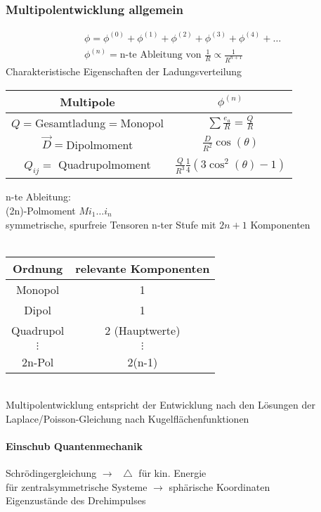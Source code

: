 \documentclass[a4paper]{article}
\newcommand*\laplace{\mathop{}\!\mathbin\bigtriangleup}
\begin{document}
\subsubsection{Multipolentwicklung allgemein}
\begin{align}
\phi=\phi^{(0)}+\phi^{(1)}+\phi^{(2)}+\phi^{(3)}+\phi^{(4)}+\ldots\\
\phi^{(n)}=\text{n-te Ableitung von }\frac{1}{R}\propto \frac{1}{R^{n+1}}
\end{align}
Charakteristische Eigenschaften der Ladungsverteilung\\
\begin{tabular}{c|c}
Multipole & $\phi^{(n)}$\\
\hline
$Q=$Gesamtladung$=$Monopol & $\sum \frac{e_a}{R}=\frac{Q}{R}$\\
$\vec{D}=$Dipolmoment &$\frac{D}{R^2}\cos(\theta)$\\
$Q_{ij}=$ Quadrupolmoment & $\frac{Q}{R^3}\frac{1}{4}\left(3
\cos^2(\theta)-1\right)$\\
\end{tabular}
n-te Ableitung:\\ 
(2n)-Polmoment $M{i_1\ldots i_n}$\\
symmetrische, spurfreie Tensoren n-ter Stufe mit $2n+1$  Komponenten\\\\
\begin{tabular}{c|c}
Ordnung & relevante Komponenten\\
\hline
Monopol & 1\\
Dipol & 1\\
Quadrupol & 2 (Hauptwerte)\\
$\vdots$&$\vdots$\\
2n-Pol & 2(n-1)
\end{tabular}\\

Multipolentwicklung entspricht der Entwicklung nach den Lösungen der
Laplace/Poisson-Gleichung nach Kugelflächenfunktionen
\paragraph{Einschub Quantenmechanik}
Schrödingergleichung
$\rightarrow \laplace$ für kin. Energie\\
für zentralsymmetrische Systeme $\rightarrow$ sphärische Koordinaten\\
Eigenzustände des Drehimpulses
\end{document}
